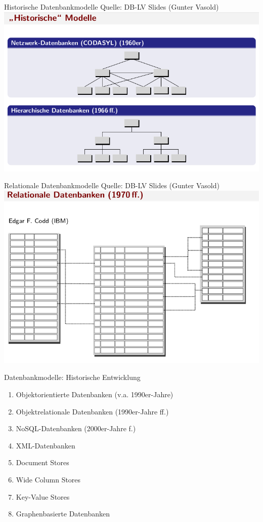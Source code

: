 \begin{frame}{Historische Datenbankmodelle}
Quelle: DB-LV Slides (Gunter Vasold)
  \includegraphics[width=\textwidth]{img/gunther-histor-db-modelle.png}
\end{frame}


\begin{frame}{Relationale Datenbankmodelle}
Quelle: DB-LV Slides (Gunter Vasold)
  \includegraphics[width=\textwidth]{img/gunter-rel-db.png}
\end{frame}


\begin{frame}{Datenbankmodelle: Historische Entwicklung}
\begin{enumerate}
    \item Objektorientierte Datenbanken (v.a. 1990er-Jahre)
    \item Objektrelationale Datenbanken (1990er-Jahre ff.)
    \item NoSQL-Datenbanken (2000er-Jahre f.)
    \item XML-Datenbanken
    \item Document Stores
    \item Wide Column Stores
    \item Key-Value Stores
    \item Graphenbasierte Datenbanken
\end{enumerate}
\end{frame}


